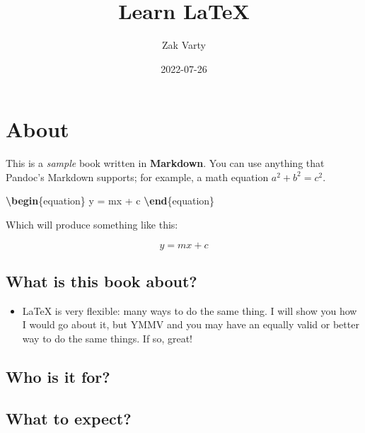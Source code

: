 \documentclass[
]{book}
\title{Learn LaTeX}
\author{Zak Varty}
\date{2022-07-26}
\newenvironment{Shaded}{\begin{snugshade}}{\end{snugshade}}
\newcommand{\ExtensionTok}[1]{#1}
\newcommand{\KeywordTok}[1]{\textcolor[rgb]{0.13,0.29,0.53}{\textbf{#1}}}
\newcommand{\NormalTok}[1]{#1}
\newcommand{\SpecialStringTok}[1]{\textcolor[rgb]{0.31,0.60,0.02}{#1}}
\providecommand{\tightlist}{%
  \setlength{\itemsep}{0pt}\setlength{\parskip}{0pt}}
\begin{document}
\maketitle

{
\setcounter{tocdepth}{1}
\tableofcontents
}
\hypertarget{about}{%
\chapter*{About}\label{about}}

This is a \emph{sample} book written in \textbf{Markdown}. You can use anything that Pandoc's Markdown supports; for example, a math equation \(a^2 + b^2 = c^2\).

\begin{Shaded}
\begin{Highlighting}[]
\KeywordTok{\textbackslash{}begin}\NormalTok{\{}\ExtensionTok{equation}\NormalTok{\}}
\SpecialStringTok{y = mx  + c}
\KeywordTok{\textbackslash{}end}\NormalTok{\{}\ExtensionTok{equation}\NormalTok{\}}
\end{Highlighting}
\end{Shaded}

Which will produce something like this:

\begin{equation}
y = mx  + c 
\label{eq:binom}
\end{equation}

\hypertarget{what-is-this-book-about}{%
\section{What is this book about?}\label{what-is-this-book-about}}

\begin{itemize}
\tightlist
\item
  LaTeX is very flexible: many ways to do the same thing. I will show you how I would go about it, but YMMV and you may have an equally valid or better way to do the same things. If so, great!
\end{itemize}

\hypertarget{who-is-it-for}{%
\section{Who is it for?}\label{who-is-it-for}}

\hypertarget{what-to-expect}{%
\section{What to expect?}\label{what-to-expect}}
\end{document}
